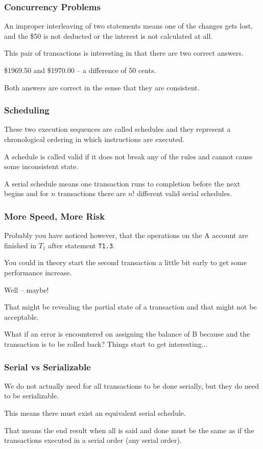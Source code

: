 \begin{frame}
\frametitle{Concurrency Problems}

 An improper interleaving of two statements means one of the changes gets lost, and the \$50 is not deducted or the interest is not calculated at all. 
 
This pair of transactions is interesting in that there are two correct answers. 
 
\$1969.50 and \$1970.00 -- a difference of 50 cents.

Both answers are correct in the sense that they are consistent.

\end{frame}

\begin{frame}
\frametitle{Scheduling}

These two execution sequences are called \alert{schedules} and they represent a chronological ordering in which instructions are executed.

A schedule is called valid if it does not break any of the rules and cannot cause some inconsistent state.

 A serial schedule means one transaction runs to completion before the next begins and for $n$ transactions there are $n!$ different valid serial schedules. 


\end{frame}

\begin{frame}
\frametitle{More Speed, More Risk}

Probably you have noticed however, that the operations on the A account are finished in $T_{1}$ after statement \texttt{T1.3}. 

You could in theory start the second transaction a little bit early to get some performance increase. 

Well -- maybe! 

That might be revealing the partial state of a transaction and that might not be acceptable. 

What if an error is encountered on assigning the balance of B because and the transaction is to be rolled back? Things start to get interesting...


\end{frame}

\begin{frame}
\frametitle{Serial vs Serializable}

We do not actually need for all transactions to be done serially, but they do need to be \alert{serializable}.

This means there must exist an equivalent serial schedule.

That means the end result when all is said and done must be the same as if the transactions executed in a serial order (any serial order).

\end{frame}


